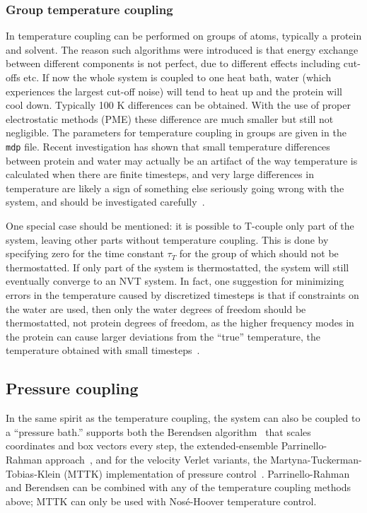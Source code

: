 \subsubsection{Group temperature coupling}%
In {\gromacs} temperature coupling can be performed on groups of
atoms, typically a protein and solvent. The reason such algorithms
were introduced is that energy exchange between different components
is not perfect, due to different effects including cut-offs etc. If
now the whole system is coupled to one heat bath, water (which
experiences the largest cut-off noise) will tend to heat up and the
protein will cool down. Typically 100 K differences can be obtained.
With the use of proper electrostatic methods (PME) these difference
are much smaller but still not negligible.  The parameters for
temperature coupling in groups are given in the {\tt mdp} file.
Recent investigation has shown that small temperature differences
between protein and water may actually be an artifact of the way
temperature is calculated when there are finite timesteps, and very
large differences in temperature are likely a sign of something else
seriously going wrong with the system, and should be investigated
carefully~\cite{Eastwood2010}.

One special case should be mentioned: it is possible to T-couple only
part of the system, leaving other parts without temperature
coupling. This is done by specifying zero for the time constant
$\tau_T$ for the group of which should not be thermostatted.  If only
part of the system is thermostatted, the system will still eventually
converge to an NVT system.  In fact, one suggestion for minimizing
errors in the temperature caused by discretized timesteps is that if
constraints on the water are used, then only the water degrees of
freedom should be thermostatted, not protein degrees of freedom, as
the higher frequency modes in the protein can cause larger deviations
from the ``true'' temperature, the temperature obtained with small
timesteps~\cite{Eastwood2010}.

\subsection{Pressure coupling}
In the same spirit as the temperature coupling, the system can also be
coupled to a ``pressure bath.'' {\gromacs} supports both the Berendsen
algorithm~\cite{Berendsen84} that scales coordinates and box vectors
every step, the extended-ensemble Parrinello-Rahman approach~\cite{Parrinello81,Nose83}, and for
the velocity Verlet variants, the Martyna-Tuckerman-Tobias-Klein
(MTTK) implementation of pressure
control~\cite{Martyna1996}. Parrinello-Rahman and Berendsen can be
combined with any of the temperature coupling methods above; MTTK can
only be used with Nos{\'e}-Hoover temperature control.

